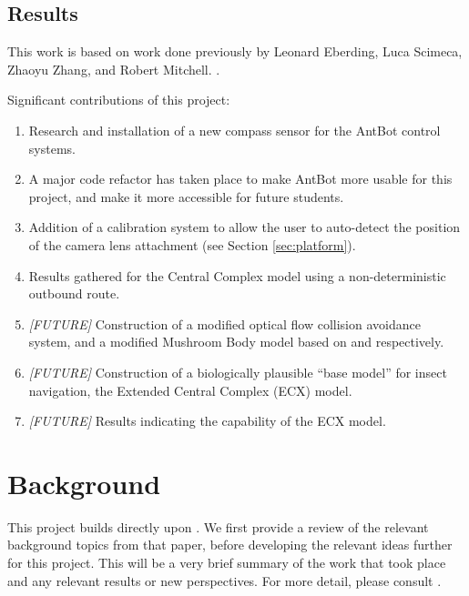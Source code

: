 \documentclass[a4paper,11pt,twoside,openright]{article}
\let\oldsection\section
\def\section{\cleardoublepage\oldsection}
\begin{document}
\subsection { Results }
This work is based on work done previously by Leonard Eberding, Luca Scimeca,
Zhaoyu Zhang, and Robert Mitchell.
\cite{Eberding2016, Scimeca2017, Zhang2017, Mitchell2018}.
\newline

Significant contributions of this project:
\begin{enumerate}
\item{
  Research and installation of a new compass sensor for the AntBot control
  systems.
}

\item{
  A major code refactor has taken place to make AntBot more usable for this
  project, and make it more accessible for future students.
}

\item{
  Addition of a calibration system to allow the user to auto-detect the position
  of the camera lens attachment (see Section \ref{sec:platform}).
}

\item{
  Results gathered for the Central Complex model using a non-deterministic
  outbound route.
}

\item{
  \textit{[FUTURE]}
  Construction of a modified optical flow collision avoidance system, and a
  modified Mushroom Body model based on \cite{Mitchell2018} and \cite{Zhang2017}
  respectively.
}

\item{
  \textit{[FUTURE]} Construction of a biologically plausible ``base model'' for
  insect navigation, the Extended Central Complex (ECX) model.
}

\item{
  \textit{[FUTURE]} Results indicating the capability of the ECX model.
}
\end{enumerate}
\newpage

\section{ Background }
This project builds directly upon \cite{Mitchell2018}. We first provide a review
of the relevant background topics from that paper, before developing the relevant
ideas further for this project. This will be a very brief summary of the work
that took place and any relevant results or new perspectives. For more detail,
please consult \cite{Mitchell2018}.
\end{document}
